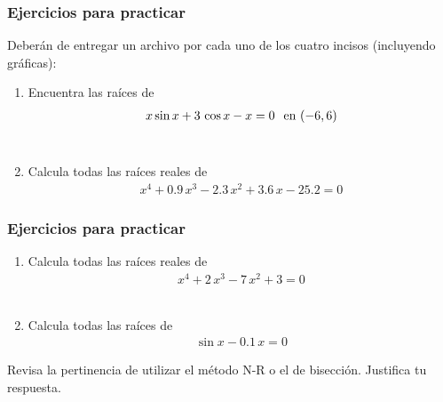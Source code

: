 

\begin{frame}
\frametitle{Ejercicios para practicar}
Deberán de entregar un archivo por cada uno de los cuatro incisos (incluyendo gráficas):
\begin{enumerate}
\item Encuentra las raíces de
\begin{align*}
x \sin x + 3 \, \cos x - x = 0 \hspace{0.25cm} \text{en } (-6,6)
\end{align*} \\
\item Calcula todas las raíces reales de
\begin{align*}
x^{4} + 0.9\, x^{3} - 2.3 \,x^{2} + 3.6 \, x - 25.2 = 0
\end{align*}
\seti
\end{enumerate}
\end{frame}
\begin{frame}
\frametitle{Ejercicios para practicar}
\begin{enumerate}
\conti
\item Calcula todas las raíces reales de
\begin{align*}
x^{4} + 2 \, x^{3} - 7 \, x^{2} + 3 = 0
\end{align*} \\
\item Calcula todas las raíces de
\begin{align*}
\sin x - 0.1 \, x = 0
\end{align*}
\end{enumerate}
Revisa la pertinencia de utilizar el método N-R o el de bisección. Justifica tu respuesta.
\end{frame}
